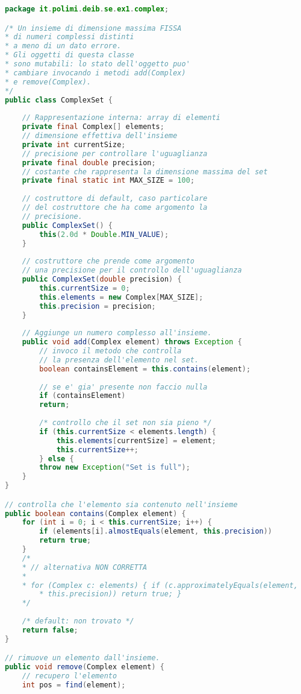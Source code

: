 \documentclass{article}
\begin{document}
\begin{lstlisting}[language=Java,escapechar=|]
package it.polimi.deib.se.ex1.complex;

/* Un insieme di dimensione massima FISSA
* di numeri complessi distinti
* a meno di un dato errore.
* Gli oggetti di questa classe
* sono mutabili: lo stato dell'oggetto puo'
* cambiare invocando i metodi add(Complex)
* e remove(Complex).
*/
public class ComplexSet {
	
	// Rappresentazione interna: array di elementi
	private final Complex[] elements;
	// dimensione effettiva dell'insieme
	private int currentSize;
	// precisione per controllare l'uguaglianza
	private final double precision;
	// costante che rappresenta la dimensione massima del set
	private final static int MAX_SIZE = 100;
	
	// costruttore di default, caso particolare
	// del costruttore che ha come argomento la
	// precisione.
	public ComplexSet() {
		this(2.0d * Double.MIN_VALUE);
	}
	
	// costruttore che prende come argomento
	// una precisione per il controllo dell'uguaglianza
	public ComplexSet(double precision) {
		this.currentSize = 0;
		this.elements = new Complex[MAX_SIZE];
		this.precision = precision;
	}
	
	// Aggiunge un numero complesso all'insieme.
	public void add(Complex element) throws Exception {
		// invoco il metodo che controlla
		// la presenza dell'elemento nel set.
		boolean containsElement = this.contains(element);
		
		// se e' gia' presente non faccio nulla
		if (containsElement)
		return;
		
		/* controllo che il set non sia pieno */
		if (this.currentSize < elements.length) {
			this.elements[currentSize] = element;
			this.currentSize++;
		} else {
		throw new Exception("Set is full");
	}
}

// controlla che l'elemento sia contenuto nell'insieme
public boolean contains(Complex element) {
	for (int i = 0; i < this.currentSize; i++) {
		if (elements[i].almostEquals(element, this.precision))
		return true;
	}
	/*
	* // alternativa NON CORRETTA
	*
	* for (Complex c: elements) { if (c.approximatelyEquals(element,
		* this.precision)) return true; }
	*/
	
	/* default: non trovato */
	return false;
}

// rimuove un elemento dall'insieme.
public void remove(Complex element) {
	// recupero l'elemento
	int pos = find(element);
	

\end{lstlisting}
\end{document}

